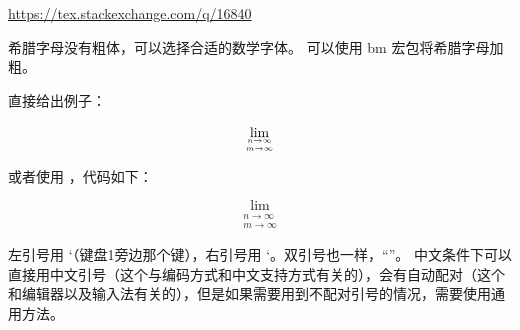 \begin{reference}
  \item \url{https://tex.stackexchange.com/q/16840}
\end{reference}


\iffalse



希腊字母没有粗体，可以选择合适的数学字体。 可以使用 bm
宏包将希腊字母加粗。



直接给出例子：

\begin{example}
\[ \lim_{n\to\infty\atop m\to\infty} \]
\end{example}
%



或者使用 ，代码如下：

%
%
%
%
\begin{example}
\[ \lim_{\substack{n\to\infty\\ m\to\infty}} \]
\end{example}
 



左引号用 `（键盘1旁边那个键），右引号用 `。双引号也一样，``''。
中文条件下可以直接用中文引号（这个与编码方式和中文支持方式有关的），会有自动配对（这个和编辑器以及输入法有关的），但是如果需要用到不配对引号的情况，需要使用通用方法。


